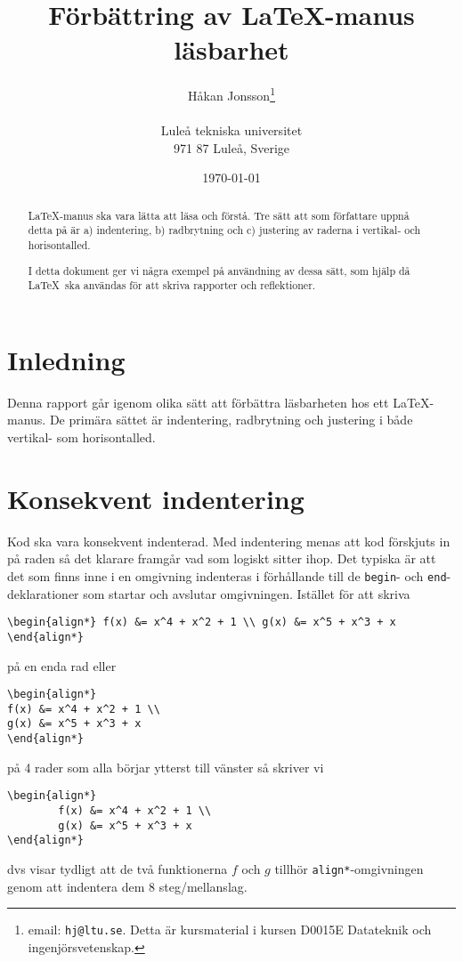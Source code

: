 \documentclass[a4paper,12pt]{article}
\title{Förbättring av \LaTeX-manus läsbarhet}
\author{Håkan Jonsson\thanks{email: \texttt{hj@ltu.se}. Detta är
      kursmaterial i kursen D0015E Datateknik och ingenjörsvetenskap.} \\  
        ~ \\
        Luleå tekniska universitet \\ 
        971 87 Luleå, Sverige}
\date{\today}
\begin{document}
\maketitle


\begin{abstract}
  \LaTeX-manus ska vara lätta att läsa och förstå. Tre sätt att som
  författare uppnå detta på är a) indentering, b) radbrytning och c)
  justering av raderna i vertikal- och horisontalled.

  
  I detta dokument ger vi några exempel på användning av
  dessa sätt, som hjälp då \LaTeX\ ska användas för att skriva
  rapporter och reflektioner. 
\end{abstract}


\section{Inledning}


Denna rapport går igenom olika sätt att förbättra läsbarheten hos ett
\LaTeX-manus. De primära sättet är indentering, radbrytning och
justering i både vertikal- som horisontalled.


\section{Konsekvent indentering}


Kod ska vara konsekvent indenterad. Med indentering menas att kod
förskjuts in på raden så det klarare framgår vad som logiskt sitter
ihop. Det typiska är att det som finns inne i en omgivning indenteras
i förhållande till de \texttt{begin}- och \texttt{end}-deklarationer
som startar och avslutar omgivningen. Istället för att skriva
%
\begin{verbatim}
\begin{align*} f(x) &= x^4 + x^2 + 1 \\ g(x) &= x^5 + x^3 + x \end{align*}
\end{verbatim}
%
på en enda rad eller
%
\begin{verbatim}
\begin{align*}
f(x) &= x^4 + x^2 + 1 \\
g(x) &= x^5 + x^3 + x
\end{align*}
\end{verbatim}
%
på 4 rader som alla börjar ytterst till vänster så skriver vi
%
\begin{verbatim}
\begin{align*}
        f(x) &= x^4 + x^2 + 1 \\
        g(x) &= x^5 + x^3 + x
\end{align*}
\end{verbatim}
%
dvs visar tydligt att de två funktionerna $f$ och $g$ tillhör
\texttt{align*}-omgivningen genom att indentera dem 8
steg/mellanslag. 
\end{document}
